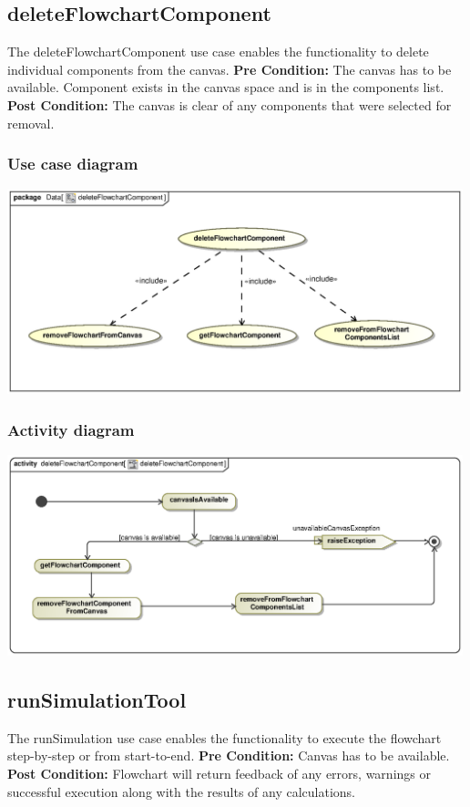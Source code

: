 \documentclass[11pt,a4paper,titlepage]{article}
\begin{document}
\subsection{deleteFlowchartComponent}
The deleteFlowchartComponent use case enables the functionality to delete individual components from the canvas.
\newline\newline
\textbf{Pre Condition:} The canvas has to be available. Component exists in the canvas space and is in the components list.
\newline\newline
\textbf{Post Condition:} The canvas is clear of any components that were selected for removal.

\subsubsection{Use case diagram}
\includegraphics[width=500px]{deleteFlowchartComponentUseCase.eps}

\subsubsection{Activity diagram}
\includegraphics[width=500px]{deleteFlowchartComponentActivity.eps}

\subsection{runSimulationTool}
The runSimulation use case enables the functionality to execute the flowchart step-by-step or from start-to-end.
\newline\newline
\textbf{Pre Condition:} Canvas has to be available.
\newline\newline
\textbf{Post Condition:} Flowchart will return feedback of any errors, warnings or successful execution along with the results of any calculations.
\end{document}
